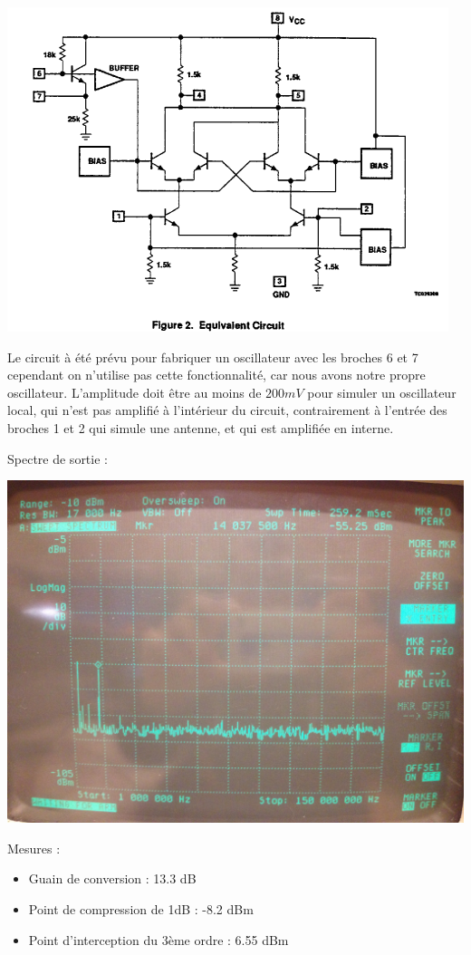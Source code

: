 \documentclass{article}
\begin{document}
\begin{center}
\includegraphics[width=0.85\linewidth]{shema_interne_ne602.png}
\end{center}

Le circuit à été prévu pour fabriquer un oscillateur avec les broches 6 et 7 cependant on n'utilise pas cette fonctionnalité, car nous avons notre propre oscillateur. L'amplitude doit être au moins de $200mV$ pour simuler un oscillateur local, qui n'est pas amplifié à l'intérieur du circuit, contrairement à l'entrée des broches 1 et 2 qui simule une antenne, et qui est amplifiée en interne.

Spectre de sortie :
\begin{center}
\includegraphics[width=0.7\linewidth]{8_3_1.jpg}
\end{center}
Mesures :
\begin{itemize}

\item Guain de conversion : 13.3 dB
\item Point de compression de 1dB : -8.2 dBm
\item Point d'interception du 3ème ordre : 6.55 dBm
\end{itemize}
\end{document}
